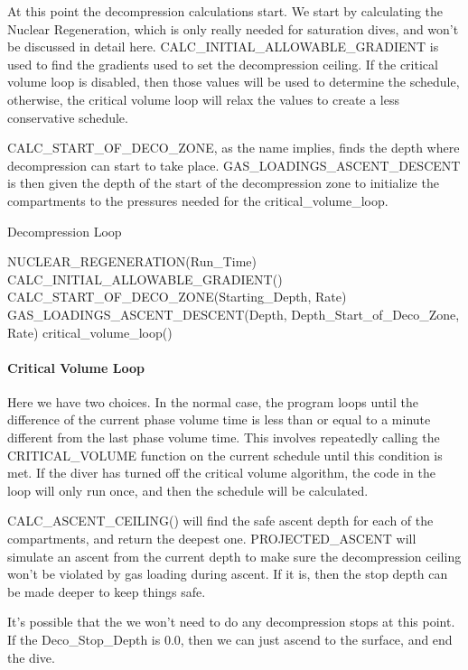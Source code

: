 \documentclass[12pt]{article}
\begin{document}
At this point the decompression calculations start. We start by calculating the Nuclear Regeneration, which
is only really needed for saturation dives, and won't be discussed in detail here. CALC\_INITIAL\_ALLOWABLE\_GRADIENT
is used to find the gradients used to set the decompression ceiling. If the critical volume loop is disabled,
then those values will be used to determine the schedule, otherwise, the critical volume loop will relax
the values to create a less conservative schedule.

 CALC\_START\_OF\_DECO\_ZONE, as the name implies, finds the depth where decompression can start
to take place. GAS\_LOADINGS\_ASCENT\_DESCENT is then given the depth of the start of the decompression
zone to initialize the compartments to the pressures needed for the critical\_volume\_loop.

\begin{algorithm}
\caption{Decompression Loop}
\label{pre3}
\begin{algorithmic}
\STATE NUCLEAR\_REGENERATION(Run\_Time)
\STATE CALC\_INITIAL\_ALLOWABLE\_GRADIENT()
\STATE CALC\_START\_OF\_DECO\_ZONE(Starting\_Depth, Rate)
\STATE GAS\_LOADINGS\_ASCENT\_DESCENT(Depth, Depth\_Start\_of\_Deco\_Zone, Rate)
\STATE critical\_volume\_loop()
\end{algorithmic}
\end{algorithm}

\paragraph{Critical Volume Loop}

Here we have two choices. In the normal case, the program loops until the difference of the
current phase volume time is less than or equal to a minute different from the last phase volume time. This involves
repeatedly calling the CRITICAL\_VOLUME function on the current schedule until this condition is met. If the
diver has turned off the critical volume algorithm, the code in the loop will only run once, and then
the schedule will be calculated.

CALC\_ASCENT\_CEILING() will find the safe ascent depth for each of the compartments, and return the deepest
one. PROJECTED\_ASCENT will simulate an ascent from the current depth to make sure the decompression ceiling
won't be violated by gas loading during ascent. If it is, then the stop depth can be made deeper to keep
things safe.

It's possible that the we won't need to do any decompression stops at this point. If the Deco\_Stop\_Depth
is 0.0, then we can just ascend to the surface, and end the dive.
\end{document}
